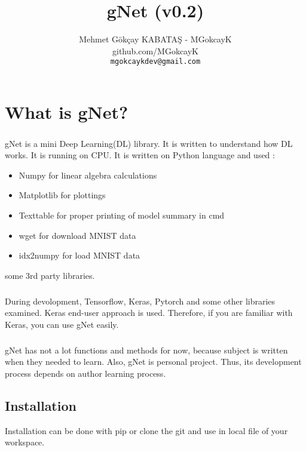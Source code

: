 \documentclass[12pt]{report}
\title {gNet (v0.2)}
\author{Mehmet Gökçay KABATAŞ - MGokcayK \\ github.com/MGokcayK \\ \texttt{mgokcaykdev@gmail.com}
}
\begin{document}
\maketitle
\tableofcontents





\chapter{What is gNet?}

\paragraph{}
gNet is a mini Deep Learning(DL) library. It is written to understand how DL works. It is running on CPU. It is written on Python language and used :

\begin{itemize}
	\item Numpy for linear algebra calculations
	\item Matplotlib for plottings
	\item Texttable for proper printing of model summary in cmd
	\item wget for download MNIST data
	\item idx2numpy for load MNIST data
\end{itemize}

some 3rd party libraries.

\paragraph{}
During devolopment, Tensorflow, Keras, Pytorch and some other libraries examined. Keras end-user approach is used. Therefore, if you are familiar with Keras, you can use gNet easily. 

\paragraph{}
gNet has not a lot functions and methods for now, because subject is written when they needed to learn. Also, gNet is personal project. Thus, its development process depends on author learning process.

\section{Installation}
Installation can be done with pip or clone the git and use in local file of your workspace.
\end{document}
